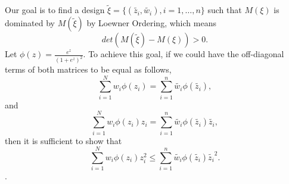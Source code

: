 \documentclass[11pt]{amsart}
\theoremstyle{definition}
\theoremstyle{remark}
\begin{document}
Our goal is to find a design $\tilde{\xi} = \{(\tilde{z_i},\tilde{w_i}), i=1,\ldots,n\}$ such that $M(\xi)$ is dominated by $M(\tilde{\xi})$ by Loewner Ordering, which means \[det(M(\tilde{\xi})-M(\xi))>0.\] Let $\phi(z) = \frac{e^z}{(1+e^{z})^2}$. To achieve this goal, if we could have the off-diagonal terms of both matrices to be equal as follows,
\begin{equation}\label{eq: beta_eq1}
\sum_{i=1}^{N} w_i \phi(z_i) = \sum_{i=1}^{n} \tilde{w_i}  \phi(\tilde{z_i}) ,
\end{equation}
and
\begin{equation}\label{eq: beta_eq2}
\sum_{i=1}^{N} w_i  \phi(z_i)z_i = \sum_{i=1}^{n} \tilde{w_i} \phi(\tilde{z_i}) \tilde{z_i},
\end{equation}
then it is sufficient to show that 
\begin{equation}\label{eq: beta_eq3}
\sum_{i=1}^{N} w_i \phi(z_i)z_i^2 \le \sum_{i=1}^{n} \tilde{w_i}\phi(\tilde{z_i})\tilde{z_i}^2.
\end{equation}.\\
\end{document}
